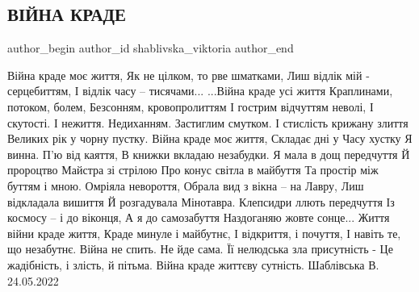  
 
 
 
 
 
\subsection{ВІЙНА КРАДЕ}
\label{sec:30_05_2022.fb.shablivska_viktoria.1.vijna_krade}
 
\ifcmt
 author_begin
   author_id shablivska_viktoria
 author_end
\fi



\raggedcolumns
\begin{multicols}{2} %
\setlength{\parindent}{0pt}

\Large
\obeycr
Війна краде моє життя,
Як не цілком, то рве шматками,
Лиш відлік мій - серцебиттям,
І відлік часу – тисячами...
\smallskip
...Війна краде усі життя
Краплинами, потоком, болем,
Безсонням, кровопролиттям
І гострим відчуттям неволі,
І скутості. І нежиття.
\smallskip
Недиханням. Застиглим смутком.
І стислість крижану злиття
Великих рік у чорну пустку. 
\smallskip
Війна краде моє життя,
Складає дні у Часу хустку
Я винна. П'ю від каяття,
В книжки вкладаю незабудки.
\smallskip
Я мала в дощ передчуття
Й пророцтво Майстра зі стрілою
Про конус світла в майбуття
Та простір між буттям і мною.
\smallskip
Омріяла невороття,
Обрала вид з вікна – на Лавру,
Лиш відкладала вишиття
Й розгадувала Мінотавра.
\smallskip
Клепсидри ллють передчуття
Із космосу – і до віконця,
А я до самозабуття 
Наздоганяю жовте сонце...
\smallskip
Життя війни краде життя,
Краде минуле і майбутнє,
І відкриття, і почуття,
І навіть те, що незабутнє.
\smallskip
Війна не спить. Не йде сама.
Її нелюдська зла присутність -
Це жадібність, і злість, й пітьма. 
Війна краде життєву сутність.
\smallskip
Шаблівська В.  24.05.2022
\restorecr

\end{multicols} %


